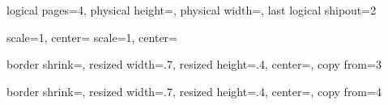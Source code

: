   {
    \edef\pgfpageoptionheight{\the\paperheight}
    \edef\pgfpageoptionwidth{\the\paperwidth}
    \edef\pgfpageoptionborder{0pt}
 }
 {
    \pgfpagesphysicalpageoptions
    {%
      logical pages=4,%
      physical height=\pgfpageoptionheight,%
      physical width=\pgfpageoptionwidth,%
      last logical shipout=2%
    }
   
        {%
                scale=1,
				center=\pgfpoint{.3\pgfphysicalwidth}{.75\pgfphysicalheight}%
        }%
        {%
                scale=1,
				center=\pgfpoint{.3\pgfphysicalwidth}{.25\pgfphysicalheight}%
        }%

   
   
    {%
      border shrink=\pgfpageoptionborder,%
      resized width=.7\pgfphysicalwidth,%
      resized height=.4\pgfphysicalheight,%
      center=\pgfpoint{.75\pgfphysicalwidth}{.3\pgfphysicalheight},%
      copy from=3
    }%
   
    {%
      border shrink=\pgfpageoptionborder,%
      resized width=.7\pgfphysicalwidth,%
      resized height=.4\pgfphysicalheight,%
      center=\pgfpoint{.75\pgfphysicalwidth}{.8\pgfphysicalheight},%
      copy from=4
    }%

 }



